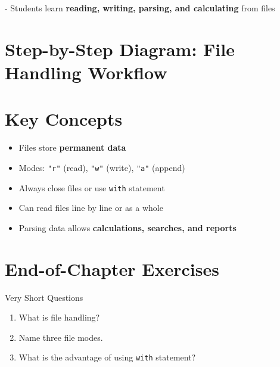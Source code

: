 - Students learn \textbf{reading, writing, parsing, and calculating} from files  

\section{Step-by-Step Diagram: File Handling Workflow}

\begin{center}
\end{center}

\section{Key Concepts}

\begin{itemize}
    \item Files store \textbf{permanent data}  
    \item Modes: \texttt{"r"} (read), \texttt{"w"} (write), \texttt{"a"} (append)  
    \item Always close files or use \texttt{with} statement  
    \item Can read files line by line or as a whole  
    \item Parsing data allows \textbf{calculations, searches, and reports}  
\end{itemize}

\section{End-of-Chapter Exercises}

\begin{exercise}{Very Short Questions}
\begin{enumerate}
    \item What is file handling?  
    \item Name three file modes.  
    \item What is the advantage of using \texttt{with} statement?  
\end{enumerate}
\end{exercise}

